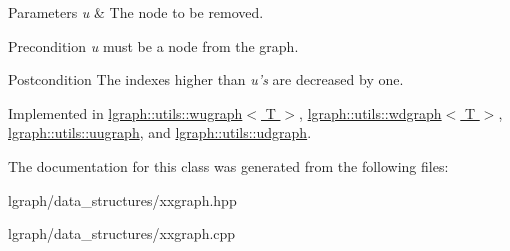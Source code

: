 \begin{DoxyParams}{Parameters}
{\em u} & The node to be removed. \\
\hline
\end{DoxyParams}
\begin{DoxyPrecond}{Precondition}
{\itshape u} must be a node from the graph. 
\end{DoxyPrecond}
\begin{DoxyPostcond}{Postcondition}
The indexes higher than {\itshape u's} are decreased by one. 
\end{DoxyPostcond}


Implemented in \hyperlink{classlgraph_1_1utils_1_1wugraph_ac51b2eccbef7bd7dd28813ac55e7d993}{lgraph\-::utils\-::wugraph$<$ T $>$}, \hyperlink{classlgraph_1_1utils_1_1wdgraph_a63740b25bf07d9943150c2c50d8be133}{lgraph\-::utils\-::wdgraph$<$ T $>$}, \hyperlink{classlgraph_1_1utils_1_1uugraph_a361156be732eb6c3b01da1ab685501ef}{lgraph\-::utils\-::uugraph}, and \hyperlink{classlgraph_1_1utils_1_1udgraph_a222b4e52f0615ffc492cdb45d93e45c8}{lgraph\-::utils\-::udgraph}.



The documentation for this class was generated from the following files\-:\begin{DoxyCompactItemize}
\item 
lgraph/data\-\_\-structures/xxgraph.\-hpp\item 
lgraph/data\-\_\-structures/xxgraph.\-cpp\end{DoxyCompactItemize}
